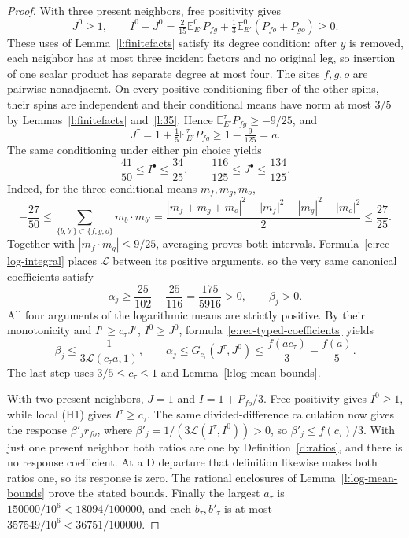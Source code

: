 \begin{proof}
With three present neighbors, free positivity gives
\[
 J^0\ge1,\qquad
 I^0-J^0=\tfrac2{15}\mathbb E^0_{E'}P_{fg}
             +\tfrac13\mathbb E^0_{E'}(P_{fo}+P_{go})\ge0.
\]
These uses of Lemma~\ref{l:finitefacts} satisfy its degree
condition: after \(y\) is removed, each neighbor has at most
three incident factors and no original leg, so insertion of one
scalar product has separate degree at most four.  The sites
\(f,g,o\) are pairwise nonadjacent.  On every positive
conditioning fiber of the other spins, their spins are independent
and their conditional means have norm at most \(3/5\) by
Lemmas~\ref{l:finitefacts} and~\ref{l:35}.  Hence
\(\mathbb E^\tau_{E'}P_{fg}\ge-9/25\), and
\[
 J^\tau=1+\tfrac15\mathbb E^\tau_{E'}P_{fg}
          \ge1-\tfrac9{125}=a.
\]
The same conditioning under either pin choice yields
\[
 \frac{41}{50}\le I^\bullet\le\frac{34}{25},\qquad
 \frac{116}{125}\le J^\bullet\le\frac{134}{125}.
\]
Indeed, for the three conditional means \(m_f,m_g,m_o\),
\[
 -\frac{27}{50}\le
 \sum_{\{b,b'\}\subset\{f,g,o\}}m_b\cdot m_{b'}
 =\frac{|m_f+m_g+m_o|^2-|m_f|^2-|m_g|^2-|m_o|^2}{2}
 \le\frac{27}{25}.
\]
Together with \(|m_f\cdot m_g|\le9/25\), averaging proves
both intervals.  Formula~\eqref{e:rec-log-integral} places
\(\mathcal L\) between its positive arguments, so the very same
canonical coefficients satisfy
\[
 \alpha_j\ge\frac{25}{102}-\frac{25}{116}
              =\frac{175}{5916}>0,\qquad \beta_j>0.
\]
All four arguments of the logarithmic means are strictly positive.
By their monotonicity and \(I^\tau\ge c_\tau J^\tau\),
\(I^0\ge J^0\), formula~\eqref{e:rec-typed-coefficients} yields
\[
 \beta_j\le\frac1{3\mathcal L(c_\tau a,1)},\qquad
 \alpha_j\le G_{c_\tau}(J^\tau,J^0)
        \le\frac{f(ac_\tau)}3-\frac{f(a)}5.
\]
The last step uses \(3/5\le c_\tau\le1\) and
Lemma~\ref{l:log-mean-bounds}.

With two present neighbors, \(J=1\) and
\(I=1+P_{fo}/3\).  Free positivity gives \(I^0\ge1\),
while local (H1) gives \(I^\tau\ge c_\tau\).
The same divided-difference calculation now gives the response
\(\beta'_jr_{fo}\), where
\(\beta'_j=1/(3\mathcal L(I^\tau,I^0))>0\), so
\(\beta'_j\le f(c_\tau)/3\).  With just one present neighbor
both ratios are one by Definition~\ref{d:ratios}, and there is
no response coefficient.  At a \(\mathrm D\) departure that
definition likewise makes both ratios one, so its response is zero.
The rational enclosures of Lemma~\ref{l:log-mean-bounds} prove
the stated bounds.  Finally the largest \(a_\tau\) is
\(150000/10^6<18094/100000\), and each \(b_\tau,b'_\tau\)
is at most \(357549/10^6<36751/100000\).
\end{proof}


